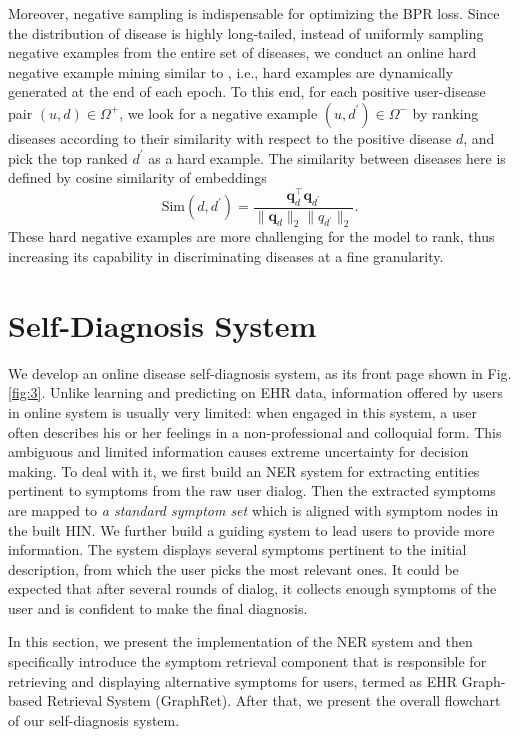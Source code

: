 \documentclass[sigconf]{acmart}
\newcommand{\q}{\bm{q}}
\begin{document}
Moreover, negative sampling is indispensable for optimizing the BPR loss. Since the distribution of disease is highly long-tailed, instead of uniformly sampling negative examples from the entire set of diseases, we conduct an online hard negative example mining similar to \cite{ying2018graph}, i.e., hard examples are dynamically generated at the end of each epoch. To this end, for each positive user-disease pair $(u,d) \in \Omega^+$, we look for a negative example  $(u,d^\prime) \in \Omega^-$ by ranking diseases according to their similarity with respect to the positive disease $d$, and pick the top ranked $d^\prime$ as a hard example. The similarity between diseases here is defined by cosine similarity of embeddings
\begin{equation}
\text{Sim}(d, d^\prime) = \frac{\q_d^{\top}\q_{d^\prime}}{\|\q_d\|_2\|q_{d^\prime}\|_2} .
\end{equation}
 These hard negative examples are more challenging for the model to rank, thus increasing its capability in discriminating diseases at a fine granularity.

\section{Self-Diagnosis System} \label{sec:selfdiag}
We develop an online disease self-diagnosis system, as its front page shown in Fig. \ref{fig:3}. Unlike learning and predicting on EHR data, information offered by users in online system is usually very limited: when engaged in this system, a user often describes his or her feelings in a non-professional and colloquial form. This ambiguous and limited information causes extreme uncertainty for decision making. To deal with it, we first build an NER system for extracting entities pertinent to symptoms from the raw user dialog. Then the extracted symptoms are mapped to \emph{a standard symptom set} which is aligned with symptom nodes in the built HIN. We further build a guiding system to lead users to provide more information. The system displays several symptoms pertinent to the initial description, from which the user picks the most relevant ones. It could be expected that after several rounds of dialog, it collects enough symptoms of the user and is confident to make the final diagnosis.

In this section, we present the implementation of the NER system and then specifically introduce the symptom retrieval component that is responsible for retrieving and displaying alternative symptoms for users, termed as EHR Graph-based Retrieval System (GraphRet). After that, we present the overall flowchart of our self-diagnosis system.
\end{document}
